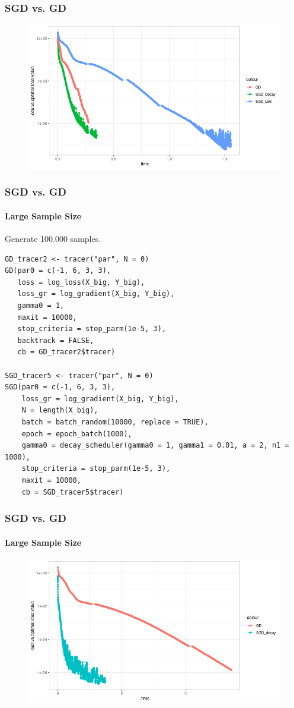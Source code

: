 \documentclass[aspectratio=169]{beamer}
\begin{document}
\begin{frame}
    \frametitle{SGD vs. GD}
    \begin{figure}
        \centering
        \includegraphics[scale = 0.4]{figure/GD_Comparison.png}
    \end{figure}
\end{frame}
\begin{frame}[fragile]
    \frametitle{SGD vs. GD}
    \framesubtitle{Large Sample Size}
    Generate 100.000 samples.
\begin{verbatim}
GD_tracer2 <- tracer("par", N = 0)
GD(par0 = c(-1, 6, 3, 3),
   loss = log_loss(X_big, Y_big),
   loss_gr = log_gradient(X_big, Y_big),
   gamma0 = 1,
   maxit = 10000,
   stop_criteria = stop_parm(1e-5, 3),
   backtrack = FALSE,
   cb = GD_tracer2$tracer)

SGD_tracer5 <- tracer("par", N = 0)
SGD(par0 = c(-1, 6, 3, 3),
    loss_gr = log_gradient(X_big, Y_big),
    N = length(X_big),
    batch = batch_random(10000, replace = TRUE),
    epoch = epoch_batch(1000),
    gamma0 = decay_scheduler(gamma0 = 1, gamma1 = 0.01, a = 2, n1 = 1000),
    stop_criteria = stop_parm(1e-5, 3),
    maxit = 10000,
    cb = SGD_tracer5$tracer)
\end{verbatim}
\end{frame}
\begin{frame}
    \frametitle{SGD vs. GD}
    \framesubtitle{Large Sample Size}
    \begin{figure}
        \centering
        \includegraphics[scale = 0.5]{figure/100kComp.png}
    \end{figure}
\end{frame}
\end{document}

